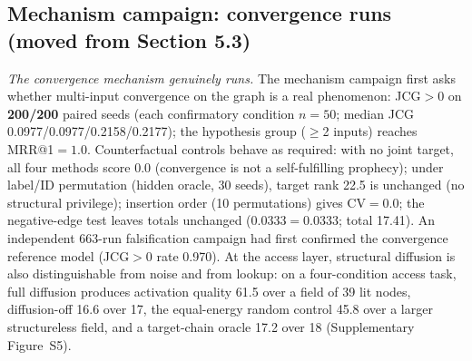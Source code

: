 \documentclass[10pt]{article}
\begin{document}
\subsection{Mechanism campaign: convergence runs (moved from Section 5.3)}
\emph{The convergence mechanism genuinely runs.} The mechanism campaign first asks whether multi-input convergence on the graph is a real phenomenon: JCG${>}$0 on \textbf{200/200} paired seeds (each confirmatory condition $n{=}50$; median JCG 0.0977/0.0977/0.2158/0.2177); the hypothesis group ($\ge$2 inputs) reaches MRR@1${=}1.0$. Counterfactual controls behave as required: with no joint target, all four methods score 0.0 (convergence is not a self-fulfilling prophecy); under label/ID permutation (hidden oracle, 30 seeds), target rank 22.5 is unchanged (no structural privilege); insertion order (10 permutations) gives CV${=}0.0$; the negative-edge test leaves totals unchanged (0.0333${=}$0.0333; total 17.41). An independent 663-run falsification campaign had first confirmed the convergence reference model (JCG${>}0$ rate 0.970). At the access layer, structural diffusion is also distinguishable from noise and from lookup: on a four-condition access task, full diffusion produces activation quality 61.5 over a field of 39 lit nodes, diffusion-off 16.6 over 17, the equal-energy random control 45.8 over a larger structureless field, and a target-chain oracle 17.2 over 18 (Supplementary Figure~S5).
\end{document}

